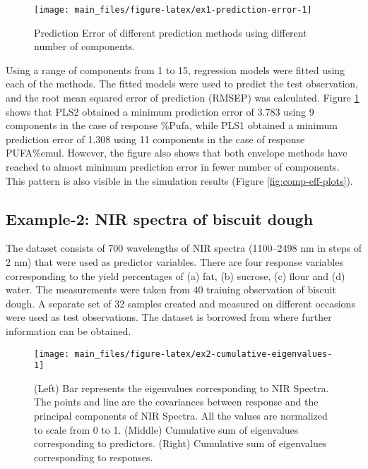 \documentclass[review]{elsarticle}
\begin{document}
\begin{figure}[!htb]
\texttt{[image: main\_files/figure-latex/ex1-prediction-error-1]} \caption{Prediction Error of different prediction methods using different number of components.}\label{fig:ex1-prediction-error}
\end{figure}

Using a range of components from 1 to 15, regression models were fitted
using each of the methods. The fitted models were used to predict the
test observation, and the root mean squared error of prediction (RMSEP)
was calculated. Figure \ref{fig:ex1-prediction-error} shows that PLS2
obtained a minimum prediction error of 3.783 using 9 components in the
case of response \%Pufa, while PLS1 obtained a minimum prediction error
of 1.308 using 11 components in the case of response PUFA\%emul.
However, the figure also shows that both envelope methods have reached
to almost minimum prediction error in fewer number of components. This
pattern is also visible in the simulation results (Figure
\ref{fig:comp-eff-plots}).

\subsection{Example-2: NIR spectra of biscuit
dough}\label{example-2-nir-spectra-of-biscuit-dough}

The dataset consists of 700 wavelengths of NIR spectra (1100--2498 nm in
steps of 2 nm) that were used as predictor variables. There are four
response variables corresponding to the yield percentages of (a) fat,
(b) sucrose, (c) flour and (d) water. The measurements were taken from
40 training observation of biscuit dough. A separate set of 32 samples
created and measured on different occasions were used as test
observations. The dataset is borrowed from \citet{indahl2005twist} where
further information can be obtained.








\begin{figure}
\texttt{[image: main\_files/figure-latex/ex2-cumulative-eigenvalues-1]} \caption{(Left) Bar represents the eigenvalues
corresponding to NIR Spectra. The points and line are the covariances
between response and the principal components of NIR Spectra. All the
values are normalized to scale from 0 to 1. (Middle) Cumulative sum of
eigenvalues corresponding to predictors. (Right) Cumulative sum of
eigenvalues corresponding to responses.}\label{fig:ex2-cumulative-eigenvalues}
\end{figure}
\end{document}
